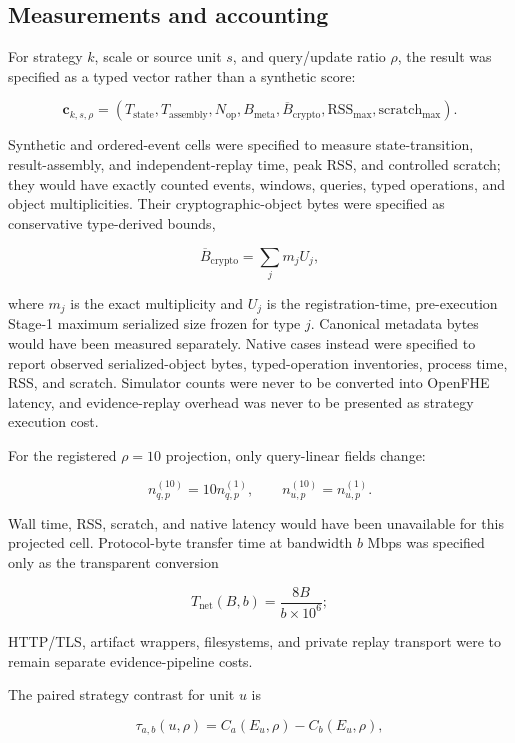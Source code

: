 \subsection{Measurements and accounting}\label{measurements-and-accounting}

For strategy \(k\), scale or source unit \(s\), and query/update ratio \(\rho\), the result was specified as a typed vector rather than a synthetic score:

\[
\mathbf{c}_{k,s,\rho}=
\left(
T_{\mathrm{state}},
T_{\mathrm{assembly}},
N_{\mathrm{op}},
B_{\mathrm{meta}},
\overline{B}_{\mathrm{crypto}},
\mathrm{RSS}_{\max},
\mathrm{scratch}_{\max}
\right).
\]

Synthetic and ordered-event cells were specified to measure state-transition, result-assembly, and independent-replay time, peak RSS, and controlled scratch; they would have exactly counted events, windows, queries, typed operations, and object multiplicities. Their cryptographic-object bytes were specified as conservative type-derived bounds,

\[
\overline{B}_{\mathrm{crypto}}=\sum_j m_jU_j,
\]

where \(m_j\) is the exact multiplicity and \(U_j\) is the registration-time, pre-execution Stage-1 maximum serialized size frozen for type \(j\). Canonical metadata bytes would have been measured separately. Native cases instead were specified to report observed serialized-object bytes, typed-operation inventories, process time, RSS, and scratch. Simulator counts were never to be converted into OpenFHE latency, and evidence-replay overhead was never to be presented as strategy execution cost.

For the registered \(\rho=10\) projection, only query-linear fields change:

\[
n^{(10)}_{q,p}=10n^{(1)}_{q,p},\qquad
n^{(10)}_{u,p}=n^{(1)}_{u,p}.
\]

Wall time, RSS, scratch, and native latency would have been unavailable for this projected cell. Protocol-byte transfer time at bandwidth \(b\) Mbps was specified only as the transparent conversion

\[
T_{\mathrm{net}}(B,b)=\frac{8B}{b\times10^6};
\]

HTTP/TLS, artifact wrappers, filesystems, and private replay transport were to remain separate evidence-pipeline costs.

The paired strategy contrast for unit \(u\) is

\[
\tau_{a,b}(u,\rho)=C_a(E_u,\rho)-C_b(E_u,\rho),
\]

